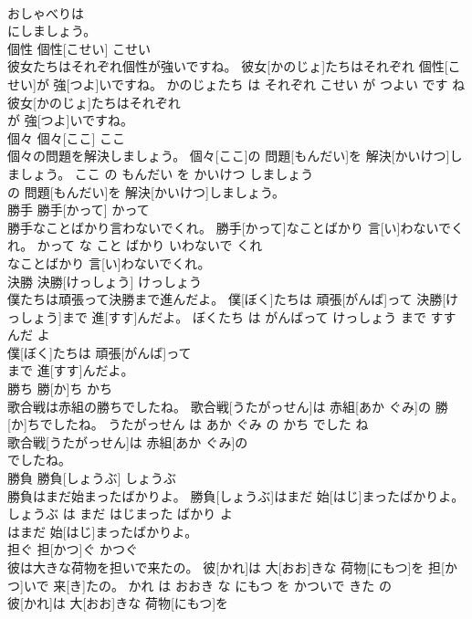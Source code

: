 \documentclass[8pt]{extreport}
\begin{document}
\begin{CJK}{UTF8}{min}
\\	おしゃべりは
\\	にしましょう。			
\\	個性	個性[こせい]	こせい	
\\	彼女たちはそれぞれ個性が強いですね。	彼女[かのじょ]たちはそれぞれ 個性[こせい]が 強[つよ]いですね。	かのじょたち は それぞれ こせい が つよい です ね	
\\	彼女[かのじょ]たちはそれぞれ
\\	が 強[つよ]いですね。			
\\	個々	個々[ここ]	ここ	
\\	個々の問題を解決しましょう。	個々[ここ]の 問題[もんだい]を 解決[かいけつ]しましょう。	ここ の もんだい を かいけつ しましょう	
\\	の 問題[もんだい]を 解決[かいけつ]しましょう。			
\\	勝手	勝手[かって]	かって	
\\	勝手なことばかり言わないでくれ。	勝手[かって]なことばかり 言[い]わないでくれ。	かって な こと ばかり いわないで くれ	
\\	なことばかり 言[い]わないでくれ。			
\\	決勝	決勝[けっしょう]	けっしょう	
\\	僕たちは頑張って決勝まで進んだよ。	僕[ぼく]たちは 頑張[がんば]って 決勝[けっしょう]まで 進[すす]んだよ。	ぼくたち は がんばって けっしょう まで すすんだ よ	
\\	僕[ぼく]たちは 頑張[がんば]って
\\	まで 進[すす]んだよ。			
\\	勝ち	勝[か]ち	かち	
\\	歌合戦は赤組の勝ちでしたね。	歌合戦[うたがっせん]は 赤組[あか ぐみ]の 勝[か]ちでしたね。	うたがっせん は あか ぐみ の かち でした ね	
\\	歌合戦[うたがっせん]は 赤組[あか ぐみ]の
\\	でしたね。			
\\	勝負	勝負[しょうぶ]	しょうぶ	
\\	勝負はまだ始まったばかりよ。	勝負[しょうぶ]はまだ 始[はじ]まったばかりよ。	しょうぶ は まだ はじまった ばかり よ	
\\	はまだ 始[はじ]まったばかりよ。			
\\	担ぐ	担[かつ]ぐ	かつぐ	
\\	彼は大きな荷物を担いで来たの。	彼[かれ]は 大[おお]きな 荷物[にもつ]を 担[かつ]いで 来[き]たの。	かれ は おおき な にもつ を かついで きた の	
\\	彼[かれ]は 大[おお]きな 荷物[にもつ]を

\end{CJK}
\end{document}
